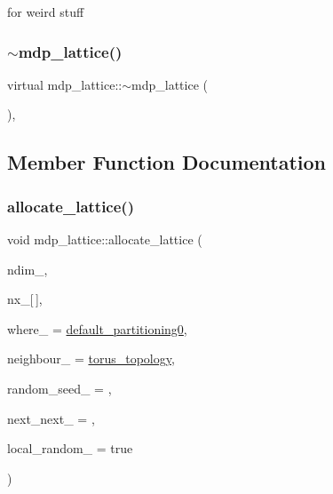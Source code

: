 for weird stuff 

\mbox{\label{classmdp__lattice_a04eafca14369c88c7c469ffeb72e54ec}} 
\subsubsection{\texorpdfstring{$\sim$mdp\+\_\+lattice()}{~mdp\_lattice()}}
{\footnotesize\ttfamily virtual mdp\+\_\+lattice\+::$\sim$mdp\+\_\+lattice (\begin{DoxyParamCaption}{ }\end{DoxyParamCaption})\hspace{0.3cm}{\ttfamily [inline]}, {\ttfamily [virtual]}}



\subsection{Member Function Documentation}
\mbox{\label{classmdp__lattice_a04f3271fe78a6f61f10c4151145f6db5}} 
\subsubsection{\texorpdfstring{allocate\+\_\+lattice()}{allocate\_lattice()}\hspace{0.1cm}{\footnotesize\ttfamily [1/2]}}
{\footnotesize\ttfamily void mdp\+\_\+lattice\+::allocate\+\_\+lattice (\begin{DoxyParamCaption}\item[{int}]{ndim\+\_\+,  }\item[{int}]{nx\+\_\+\mbox{[}$\,$\mbox{]},  }\item[{int($\ast$)(int $\ast$, int, int $\ast$)}]{where\+\_\+ = {\ttfamily \hyperlink{mdp__partitionings_8h_a717f073ea8969d6e22c586a8eba267ad}{default\+\_\+partitioning0}},  }\item[{void($\ast$)(int, int $\ast$, int $\ast$, int $\ast$, int, int $\ast$)}]{neighbour\+\_\+ = {\ttfamily \hyperlink{mdp__topologies_8h_a6aec8ec4cbeb8205be5727f6493824dd}{torus\+\_\+topology}},  }\item[{\hyperlink{mdp__global__vars_8h_aaa1ad9d0dcd2124aa5af0120d9954174}{mdp\+\_\+int}}]{random\+\_\+seed\+\_\+ = {},  }\item[{int}]{next\+\_\+next\+\_\+ = {},  }\item[{bool}]{local\+\_\+random\+\_\+ = {\ttfamily true} }\end{DoxyParamCaption})\hspace{0.3cm}{\ttfamily [inline]}}

